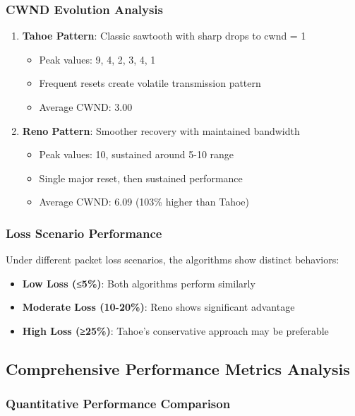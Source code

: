 \documentclass[12pt]{article}
\begin{document}
\subsubsection{CWND Evolution Analysis}
\begin{enumerate}
    \item \textbf{Tahoe Pattern}: Classic sawtooth with sharp drops to cwnd = 1
    \begin{itemize}
        \item Peak values: 9, 4, 2, 3, 4, 1
        \item Frequent resets create volatile transmission pattern
        \item Average CWND: 3.00
    \end{itemize}
    
    \item \textbf{Reno Pattern}: Smoother recovery with maintained bandwidth
    \begin{itemize}
        \item Peak values: 10, sustained around 5-10 range
        \item Single major reset, then sustained performance
        \item Average CWND: 6.09 (103\% higher than Tahoe)
    \end{itemize}
\end{enumerate}

\subsubsection{Loss Scenario Performance}
Under different packet loss scenarios, the algorithms show distinct behaviors:

\begin{itemize}
    \item \textbf{Low Loss (≤5\%)}: Both algorithms perform similarly
    \item \textbf{Moderate Loss (10-20\%)}: Reno shows significant advantage
    \item \textbf{High Loss (≥25\%)}: Tahoe's conservative approach may be preferable
\end{itemize}

\subsection{Comprehensive Performance Metrics Analysis}

\subsubsection{Quantitative Performance Comparison}
\end{document}
